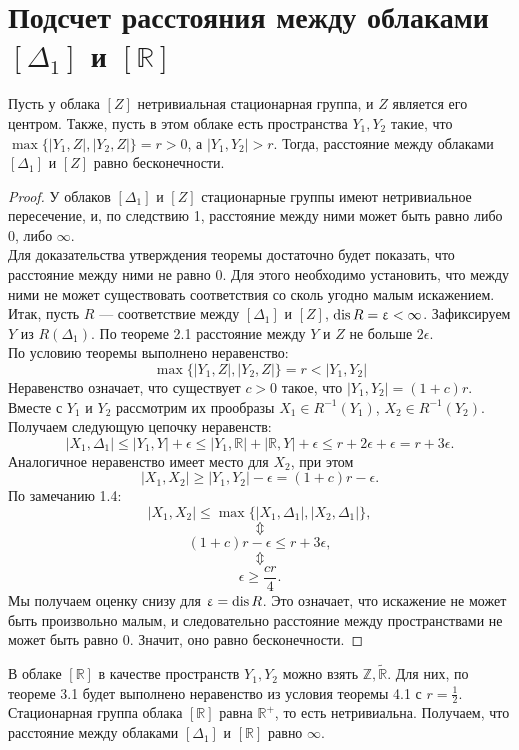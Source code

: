 
\section{Подсчет расстояния между облаками $[\Delta_1]$ и $[\mathbb{R}]$}

\begin{theorem} Пусть у облака $[Z]$ нетривиальная стационарная группа, и $Z$
является его центром. Также, пусть в этом облаке есть пространства $Y_{1}, Y_{2}$
такие, что $\max\big\{ |Y_{1},Z|, |Y_{2}, Z| \big\} = r>0$, а
$|Y_{1}, Y_{2}|>r$. Тогда, расстояние между облаками $[\Delta_1]$ и $[Z]$
равно бесконечности.
\end{theorem} 
\begin{proof} У облаков $[\Delta_1]$ и $[Z]$ стационарные группы имеют
нетривиальное пересечение, и, по следствию 1, расстояние между ними может быть
равно либо $0$, либо $\infty$. \\ Для доказательства утверждения теоремы
достаточно будет показать, что расстояние между ними не равно $0$.  Для этого
необходимо установить, что между ними не может существовать соответствия со
сколь угодно малым искажением. Итак, пусть $R$ --- соответствие между
$[\Delta_1]$ и $[Z]$, $\operatorname{dis} R = \upvarepsilon < \infty$.
Зафиксируем $Y$ из $R(\Delta_1)$. По теореме 2.1 расстояние между $Y$ и $Z$ не
больше $2\epsilon$.\\ По условию теоремы выполнено неравенство:
 $$\max\big\{ |Y_{1},Z|, |Y_{2}, Z| \big\} = r < |Y_{1}, Y_{2}|$$
Неравенство означает, что существует $c > 0$ такое, что
$|Y_{1},Y_{2}| = (1 + c)r.$ \\ Вместе с $Y_{1}$ и
$ Y_{2}$ рассмотрим их прообразы $X_1 \in R^{-1}(Y_{1})$,
$ X_2 \in R^{-1}(Y_{2})$.  \\ Получаем следующую цепочку
неравенств:
	$$|X_1, \Delta_1| \le |Y_{1}, Y| + \epsilon \le |Y_{1}, \mathbb{R}| + |\mathbb{R}, Y| +\epsilon \le r + 2\epsilon + \epsilon = r + 3\epsilon.$$
	Аналогичное неравенство имеет место для $X_2$, при этом
	$$|X_1, X_2|  \ge |Y_{1}, Y_{2}| - \epsilon = (1+c)r - \epsilon.$$
	По замечанию 1.4:
	$$|X_1, X_2| \le \max\big\{ |X_1, \Delta_1|, |X_2, \Delta_1| \big\},$$
	$$\Updownarrow$$
	$$(1+c)r - \epsilon\le r + 3\epsilon,$$
	$$\Updownarrow$$
	$$\epsilon \ge \frac{cr}{4}.$$
	Мы получаем оценку снизу для $\upvarepsilon = \operatorname{dis} R$. Это означает, что
искажение не может быть произвольно малым, и следовательно расстояние между
пространствами не может быть равно 0. Значит, оно равно бесконечности.
	
\end{proof}
\begin{corollary}
	В облаке $[\mathbb{R}]$ в качестве пространств $Y_{1}, Y_{2}$ можно взять
$\mathbb{Z}, \widetilde{\mathbb{R}}$. Для них, по теореме 3.1 будет выполнено
неравенство из условия теоремы 4.1 с $r = \frac 1 2$. Стационарная группа облака
$[\mathbb{R}]$ равна $\mathbb{R}^{+}$, то есть нетривиальна. Получаем, что расстояние между облаками
$[\Delta_{1}]$ и $[\mathbb{R}]$ равно $\infty$.
\end{corollary}
